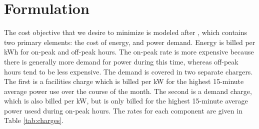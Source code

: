  

 
\section{Formulation\label{sec:formulation}} 
The cost objective that we desire to minimize is modeled after \cite{rocky_mountain_power_rocky_2021}, which contains two primary elements: the cost of energy, and power demand. Energy is billed per kWh for on-peak and off-peak hours. The on-peak rate is more expensive because there is generally more demand for power during this time, whereas off-peak hours tend to be less expensive. The demand is covered in two separate chargers.  The first is a facilities charge which is billed per kW for the highest 15-minute average power use over the course of the month. The second is a demand charge, which is also billed per kW, but is only billed for the highest 15-minute average power usesd during on-peak hours. The rates for each component are given in Table \ref{tab:charges}.  

